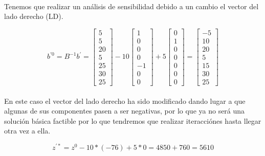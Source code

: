 \documentclass[10pt, a4paper]{article}
\begin{document}
			\paragraph{}
			Tenemos que realizar un análisis de sensibilidad debido a un cambio el vector del lado derecho (LD).

			\[
			b^{'0} = B^{-1}b^{'} =
			\begin{bmatrix}
				5 \\
				5 \\
				20 \\
				5 \\
				25 \\
				30 \\
				25
			\end{bmatrix}
			-10
			\begin{bmatrix}
				1 \\
				0 \\
				0 \\
				0 \\
				-1 \\
				0 \\
				0
			\end{bmatrix}
			+5
			\begin{bmatrix}
				0 \\
				1 \\
				0 \\
				0 \\
				0 \\
				0 \\
				0
			\end{bmatrix}
			=
			\begin{bmatrix}
				-5 \\
				10 \\
				20 \\
				5 \\
				15 \\
				30 \\
				25
			\end{bmatrix}
			\]

			\paragraph{}
			En este caso el vector del lado derecho ha sido modificado dando lugar a que algunas de sus componentes pasen a ser negativas, por lo que ya no será una solución básica factible por lo que tendremos que realizar iteracciónes hasta llegar otra vez a ella.

			\[
				z^{'*} = z^{0} -10 *(-76) +5*0 = 4850 + 760 = 5610
			\]
\end{document}
